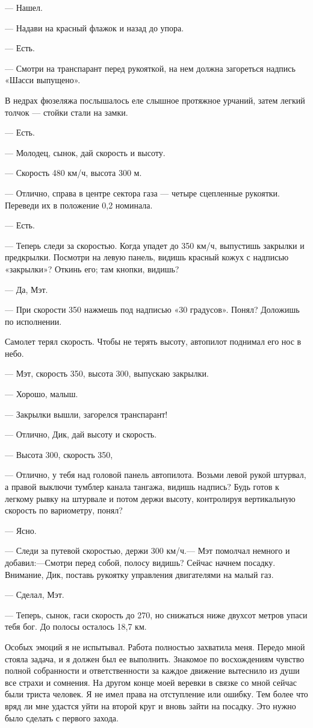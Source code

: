 \documentclass[11pt,a4paper,oneside]{article}
\begin{document}
— Нашел.

— Надави на красный флажок и назад до упора.

— Есть.

— Смотри на транспарант перед рукояткой, на нем должна загореться надпись «Шасси выпущено».

В недрах фюзеляжа послышалось еле слышное протяжное урчаний, затем легкий толчок — стойки стали на замки.

— Есть.

— Молодец, сынок, дай скорость и высоту.

— Скорость 480 км/ч, высота 300 м.

— Отлично, справа в центре сектора газа — четыре сцепленные рукоятки. Переведи их в положение 0,2 номинала.

— Есть.

— Теперь следи за скоростью. Когда упадет до 350 км/ч, выпустишь закрылки и предкрылки. Посмотри на левую панель, видишь красный кожух с надписью «закрылки»? Откинь его; там кнопки, видишь?

— Да, Мэт.

— При скорости 350 нажмешь под надписью «30 градусов». Понял? Доложишь по исполнении.

Самолет терял скорость. Чтобы не терять высоту, автопилот поднимал его нос в небо.

— Мэт, скорость 350, высота 300, выпускаю закрылки.

— Хорошо, малыш.

— Закрылки вышли, загорелся транспарант!

— Отлично, Дик, дай высоту и скорость.

— Высота 300, скорость 350,

— Отлично, у тебя над головой панель автопилота. Возьми левой рукой штурвал, а правой выключи тумблер канала тангажа, видишь надпись? Будь готов к легкому рывку на штурвале и потом держи высоту, контролируя вертикальную скорость по вариометру, понял?

— Ясно.

— Следи за путевой скоростью, держи 300 км/ч.— Мэт помолчал немного и добавил:—Смотри перед собой, полосу видишь? Сейчас начнем посадку. Внимание, Дик, поставь рукоятку управления двигателями на малый газ.

— Сделал, Мэт.

— Теперь, сынок, гаси скорость до 270, но снижаться ниже двухсот метров упаси тебя бог. До полосы осталось 18,7 км.

Особых эмоций я не испытывал. Работа полностью захватила меня. Передо мной стояла задача, и я должен был ее выполнить. Знакомое по восхождениям чувство полной собранности и ответственности за каждое движение вытеснило из души все страхи и сомнения. На другом конце моей веревки в связке со мной сейчас были триста человек. Я не имел права на отступление или ошибку. Тем более что вряд ли мне удастся уйти на второй круг и вновь зайти на посадку. Это нужно было сделать с первого захода.
\end{document}
